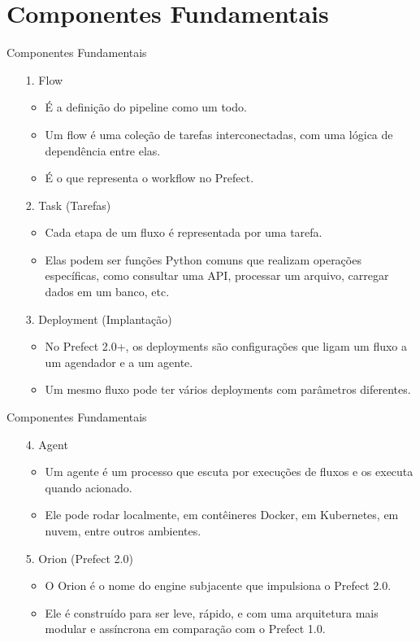 \documentclass[t,serif]{beamer}
\begin{document}
\section{Componentes Fundamentais}
	\begin{frame}{Componentes Fundamentais}
		\begin{enumerate}
			\item[1.] Flow
			\begin{itemize}
				\item É a definição do pipeline como um todo.
				\item Um flow é uma coleção de tarefas interconectadas, com uma lógica de dependência entre elas.
				\item É o que representa o workflow no Prefect.
			\end{itemize}
			\item[2.] Task (Tarefas)
			\begin{itemize}
				\item Cada etapa de um fluxo é representada por uma tarefa.
				\item Elas podem ser funções Python comuns que realizam operações específicas, como consultar uma API, processar um arquivo, carregar dados em um banco, etc.
			\end{itemize}
			\item[3.] Deployment (Implantação)
			\begin{itemize}
				\item No Prefect 2.0+, os deployments são configurações que ligam um fluxo a um agendador e a um agente. 
				\item Um mesmo fluxo pode ter vários deployments com parâmetros diferentes.
			\end{itemize}
		\end{enumerate}
	\end{frame}
	
	\begin{frame}{Componentes Fundamentais}
		\begin{enumerate}
			\item[4.] Agent
			\begin{itemize}
				\item Um agente é um processo que escuta por execuções de fluxos e os executa quando acionado.
				\item Ele pode rodar localmente, em contêineres Docker, em Kubernetes, em nuvem, entre outros ambientes.
			\end{itemize}
			\vspace{0.5cm}
			\item[5.] Orion (Prefect 2.0)
			\begin{itemize}
				\item O Orion é o nome do engine subjacente que impulsiona o Prefect 2.0.
				\item Ele é construído para ser leve, rápido, e com uma arquitetura mais modular e assíncrona em comparação com o Prefect 1.0.
			\end{itemize}
		\end{enumerate}
	\end{frame}
	
\end{document}
